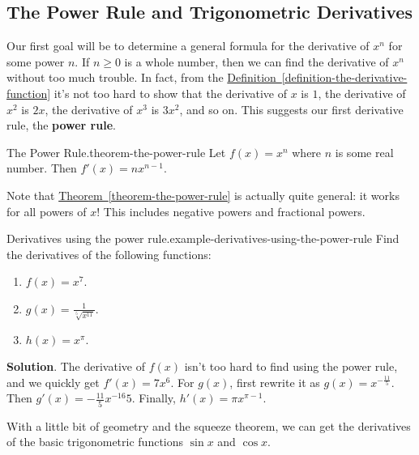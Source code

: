 \documentclass[10pt,]{book}
\newcommand{\terminology}[1]{\textbf{#1}}
\numberwithin{equation}{section}
\begin{document}
\subsection[{The Power Rule and Trigonometric Derivatives}]{The Power Rule and Trigonometric Derivatives}\label{subsection-the-power-rule-and-trigonometric-derivatives}
\hypertarget{p-124}{}%
Our first goal will be to determine a general formula for the derivative of \(x^{n}\) for some power \(n\). If \(n\geq0\) is a whole number, then we can find the derivative of \(x^{n}\) without too much trouble. In fact, from the \hyperref[definition-the-derivative-function]{Definition~\ref{definition-the-derivative-function}} it's not too hard to show that the derivative of \(x\) is \(1\), the derivative of \(x^{2}\) is \(2x\), the derivative of \(x^{3}\) is \(3x^{2}\), and so on. This suggests our first derivative rule, the \terminology{power rule}.%
\begin{theorem}{The Power Rule.}{}{theorem-the-power-rule}%
\hypertarget{p-125}{}%
Let \(f(x) = x^{n}\) where \(n\) is some real number. Then \(f'(x) = nx^{n-1}\).%
\end{theorem}
\hypertarget{p-126}{}%
Note that \hyperref[theorem-the-power-rule]{Theorem~\ref{theorem-the-power-rule}} is actually quite general: it works for all powers of \(x\)! This includes negative powers and fractional powers.%
\begin{example}{Derivatives using the power rule.}{example-derivatives-using-the-power-rule}%
\hypertarget{p-127}{}%
Find the derivatives of the following functions: \leavevmode%
\begin{enumerate}
\item\hypertarget{li-5}{}\(f(x) = x^{7}\).%
\item\hypertarget{li-6}{}\(g(x) = \frac{1}{\sqrt[5]{x^{11}}}\).%
\item\hypertarget{li-7}{}\(h(x) = x^{\pi}\).%
\end{enumerate}
%
\par\smallskip%
\noindent\textbf{Solution}.\hypertarget{solution-26}{}\quad%
\hypertarget{p-128}{}%
The derivative of \(f(x)\) isn't too hard to find using the power rule, and we quickly get \(f'(x) = 7x^{6}\). For \(g(x)\), first rewrite it as \(g(x) = x^{-\frac{11}{5}}\). Then \(g'(x) = -\frac{11}{5}x^{-16}{5}\). Finally, \(h'(x) = \pi x^{\pi-1}\).%
\end{example}
\hypertarget{p-129}{}%
With a little bit of geometry and the squeeze theorem, we can get the derivatives of the basic trigonometric functions \(\sin x\) and \(\cos x\).%
\end{document}
